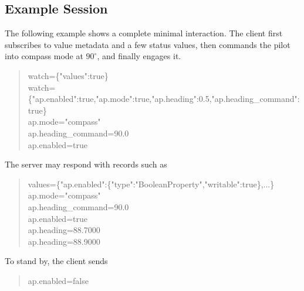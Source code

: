 \documentclass[10pt,twocolumn]{article}
\begin{document}
\subsection{Example Session}
The following example shows a complete minimal interaction.  The client
first subscribes to value metadata and a few status values, then commands
the pilot into compass mode at \(90^\circ\), and finally engages it.
\begin{quote}
\scriptsize\ttfamily
watch=\{"values":true\}\\
watch=\{"ap.enabled":true,"ap.mode":true,\allowbreak"ap.heading":0.5,\allowbreak"ap.heading\_command":true\}\\
ap.mode="compass"\\
ap.heading\_command=90.0\\
ap.enabled=true
\end{quote}
The server may respond with records such as
\begin{quote}
\scriptsize\ttfamily
values=\{"ap.enabled":\{"type":"BooleanProperty",\allowbreak"writable":true\},...\}\\
ap.mode="compass"\\
ap.heading\_command=90.0\\
ap.enabled=true\\
ap.heading=88.7000\\
ap.heading=88.9000
\end{quote}
To stand by, the client sends
\begin{quote}
\ttfamily
ap.enabled=false
\end{quote}
\end{document}
